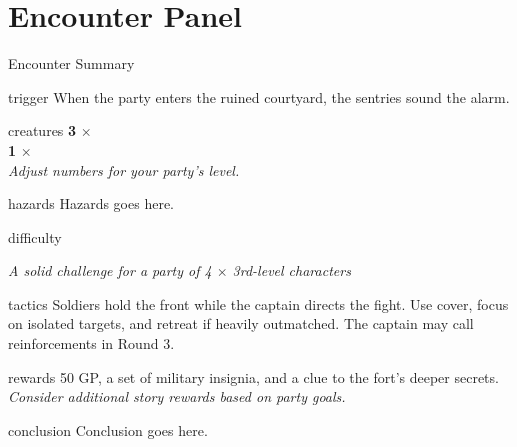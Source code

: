 \chapter*{Encounter Panel}

\begin{EncounterPanel}{Encounter Summary}

	\begin{EncounterBlock}{trigger}
		When the party enters the ruined courtyard, the sentries sound the alarm.
	\end{EncounterBlock}

	\begin{EncounterBlock}{creatures}
		\textbf{3} $\times$ \\
		\textbf{1} $\times$ \\
		\textit{\tiny Adjust numbers for your party's level.}
	\end{EncounterBlock}

	\begin{EncounterBlock}{hazards}
		Hazards goes here.
	\end{EncounterBlock}

	\begin{EncounterBlock}{difficulty}
    	
		\textit{\tiny A solid challenge for a party of 4 $\times$ 3rd-level characters}
	\end{EncounterBlock}

	\begin{EncounterBlock}{tactics}
		Soldiers hold the front while the captain directs the fight.
		Use cover, focus on isolated targets, and retreat if heavily outmatched.
		The captain may call reinforcements in Round 3.
	\end{EncounterBlock}
	
	\begin{EncounterBlock}{rewards}
		50 GP, a set of military insignia, and a clue to the fort's deeper secrets.\\
		\textit{\tiny Consider additional story rewards based on party goals.}
	\end{EncounterBlock}

	\begin{EncounterBlock}{conclusion}
		Conclusion goes here.
	\end{EncounterBlock}

\end{EncounterPanel}